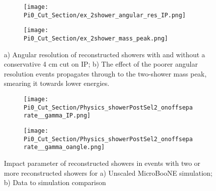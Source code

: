\begin{figure}[H]
  \begin{subfigure}[t]{0.25\textwidth}
\texttt{[image: Pi0\_Cut\_Section/ex\_2shower\_angular\_res\_IP.png]}
  \caption{ }
  \end{subfigure} 
  \hspace{30mm}
  \begin{subfigure}[t]{0.25\textwidth}
\texttt{[image: Pi0\_Cut\_Section/ex\_2shower\_mass\_peak.png]}
  \caption{ }
  \end{subfigure} 
\caption{ a) Angular resolution of reconstructed showers with and without a conservative 4 cm cut on IP; b) The effect of the poorer angular resolution events propagates through to the two-shower mass peak, smearing it towards lower energies. }
\label{fig:ex_cutjust_IP}
\end{figure}


\begin{figure}[H]
 \begin{subfigure}[t]{0.35\textwidth}
\texttt{[image: Pi0\_Cut\_Section/Physics\_showerPostSel2\_onoffseparate\_\_gamma\_IP.png]}
  \caption{ }
  \end{subfigure} 
\hspace{10mm}
 \begin{subfigure}[t]{0.35\textwidth}
    \texttt{[image: Pi0\_Cut\_Section/Physics\_showerPostSel2\_onoffseparate\_\_gamma\_oangle.png]}
  \caption{ }
  \end{subfigure} 
\caption{ Impact parameter of reconstructed showers in events with two or more reconstructed showers for a) Unscaled MicroBooNE simulation; b) Data to simulation comparison }
\label{fig:cutjust_pi0_IP}
\end{figure}


